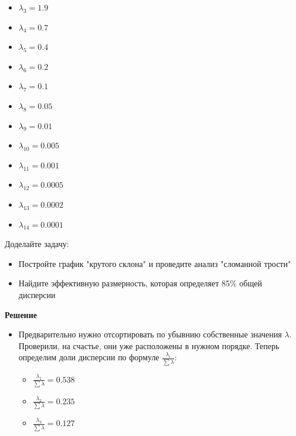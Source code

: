 \begin{enumerate}
\begin{itemize}
\begin{itemize}
                        \item $\lambda_{3}  = 1.9$
                        \item $\lambda_{4}  = 0.7$
                        \item $\lambda_{5}  = 0.4$
                        \item $\lambda_{6}  = 0.2$
                        \item $\lambda_{7}  = 0.1$
                        \item $\lambda_{8}  = 0.05$
                        \item $\lambda_{9}  = 0.01$
                        \item $\lambda_{10} = 0.005$
                        \item $\lambda_{11} = 0.001$
                        \item $\lambda_{12} = 0.0005$
                        \item $\lambda_{13} = 0.0002$
                        \item $\lambda_{14} = 0.0001$
                    \end{itemize}
          \end{itemize}\par
          Доделайте задачу: \par
          \begin{itemize}
              \item Постройте график "крутого склона" и проведите анализ "сломанной трости"
              \item Найдите эффективную размерность, которая определяет 85\% общей дисперсии
          \end{itemize}\par
          \textbf{Решение} \par
          \begin{itemize}
              \item Предварительно нужно отсортировать по убывнию собственные значения $\lambda$. Проверили, на счастье, они уже расположены в нужном порядке. Теперь определим доли дисперсии по формуле $\frac{ \lambda_i }{\sum \lambda}$: \par
                    \begin{itemize}
                        \item $\frac{ \lambda_1 }{\sum \lambda}  = 0.538$
                        \item $\frac{ \lambda_2 }{\sum \lambda}  = 0.235$
                        \item $\frac{ \lambda_3 }{\sum \lambda}  = 0.127$

\end{itemize}
\end{itemize}
\end{enumerate}
